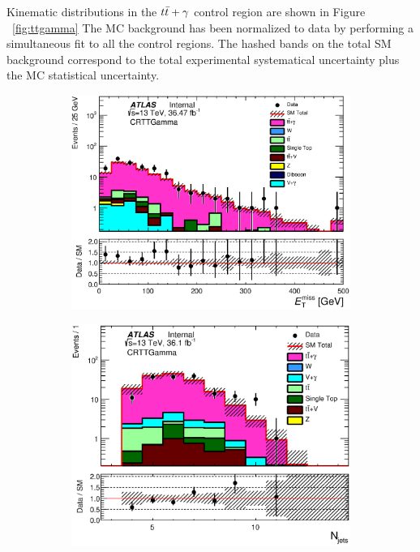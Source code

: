 

\indent Kinematic distributions in the $t\bar{t}+\gamma$ control region are shown in Figure ~\ref{fig:ttgamma}  The MC background has been normalized to data by performing a simultaneous fit to all the control regions.  The hashed bands on the total SM background correspond to the total experimental systematical uncertainty plus the MC statistical uncertainty.   \\

\pagebreak

\begin{figure}[h!]
\begin{center}
      \begin{subfigure}[b]{0.40\textwidth}    
\includegraphics[width=\textwidth]{figures/ttGamma/Met_CRTTGamma_withRatio_log.eps}
                 \caption{ }
    \end{subfigure}
      \begin{subfigure}[b]{0.40\textwidth}    
      \includegraphics[width=\textwidth]{figures/ttGamma/postfit/NJets_CRTTGamma_log.eps}

\end{subfigure}
\end{center}
\end{figure}
